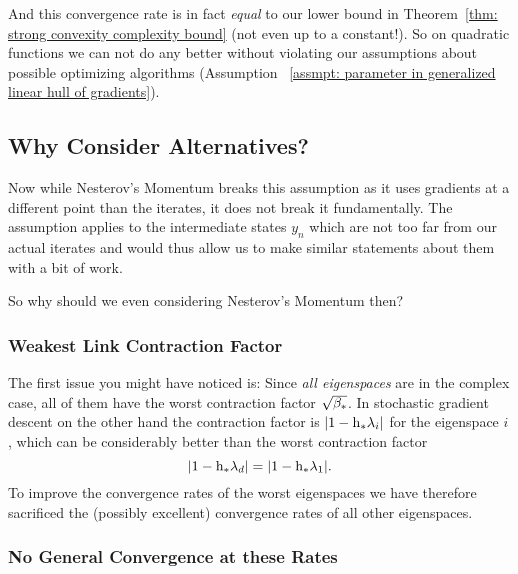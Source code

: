 And this convergence rate is in fact \emph{equal} to our lower bound  in
Theorem~\ref{thm: strong convexity complexity bound} (not even up to a
constant!). So on quadratic functions we can not do any better without violating
our assumptions about possible optimizing algorithms (Assumption~ \ref{assmpt:
parameter in generalized linear hull of gradients}).

\subsection{Why Consider Alternatives?}

Now while Nesterov's Momentum breaks this assumption as it uses gradients at a
different point than the iterates, it does not break it fundamentally. The
assumption applies to the intermediate states \(y_n\) which are not too far
from our actual iterates and would thus allow us to make similar statements
about them with a bit of work.

So why should we even considering Nesterov's Momentum then?

\subsubsection{Weakest Link Contraction Factor}

The first issue you
might have noticed is: Since \emph{all eigenspaces} are in the complex case,
all of them have the worst contraction factor \(\sqrt{\beta_*}\). In stochastic
gradient descent on the other hand the contraction factor is \(|1-\text{h}_*\lambda_i|\)
for the eigenspace \(i\), which can be considerably better than the worst
contraction factor 
\[|1-\text{h}_*\lambda_d|=|1-\text{h}_*\lambda_1|.\]
To improve the convergence rates of the worst eigenspaces we have therefore
sacrificed the (possibly excellent) convergence rates of all other eigenspaces.

\subsubsection{No General Convergence at these Rates}

